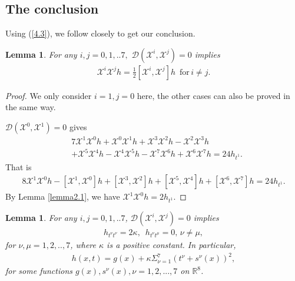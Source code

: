 \documentclass[reqno,12pt]{amsart}
\numberwithin{equation}{section}
\theoremstyle{plain}
\newtheorem{lemma}[theorem]{Lemma}
\theoremstyle{definition}
\begin{document}
\subsection{The conclusion}
Using (\ref{4.3}), we follow \cite{IMV2014} closely to get our conclusion.
\begin{lemma}\label{lemma 4.2}
For any $i,j=0,1,..7,$ $\mathcal{D}(\mathscr{X}^i,\mathscr{X}^j)=0$ implies 
   \begin{align}
       \mathscr{X}^i\mathscr{X}^j h=\frac{1}{2}[ \mathscr{X}^i,  \mathscr{X}^j]h\,\,\,\textrm{for}\,i\neq j.
   \end{align}
   
\end{lemma}
\begin{proof}
    We only consider $i=1,j=0$ here, the other cases can also be proved in the same way.
    
    $\mathcal{D}(\mathscr{X}^0,\mathscr{X}^1)=0$ gives
    \begin{align*}
        &7\mathscr{X}^1\mathscr{X}^0 h+\mathscr{X}^0 \mathscr{X}^1 h+\mathscr{X}^3 \mathscr{X}^2 h-\mathscr{X}^2 \mathscr{X}^3 h\\&+\mathscr{X}^5\mathscr{X}^4 h-\mathscr{X}^4 \mathscr{X}^5 h-\mathscr{X}^7 \mathscr{X}^6 h+\mathscr{X}^6 \mathscr{X}^7h=24h_{t^1}.        
        \end{align*}
        That is
        \begin{align*}
            8\mathscr{X}^1\mathscr{X}^0 h-[\mathscr{X}^1,\mathscr{X}^0]h+[\mathscr{X}^3,\mathscr{X}^2]h+[\mathscr{X}^5,\mathscr{X}^4]h+[\mathscr{X}^6,\mathscr{X}^7]h=24h_{t^1}.            \end{align*}
            By Lemma \ref{lemma2.1}, we have $\mathscr{X}^1 \mathscr{X}^0 h=2h_{t^1}.$
            
\end{proof}
\begin{lemma}\label{lemma 4.3}
For any $i,j=0,1,..7$,
 $\mathcal{D}(\mathscr{X}^i,\mathscr{X}^j)=0$ implies
    \begin{align}\label{4.5}
        h_{t^\nu t^\nu}=2\kappa,\,\,\, h_{t^\nu t^\mu}=0,\, \nu \neq \mu,
    \end{align}
    for $\nu,\mu=1,2,..,7$, where $\kappa$ is a positive constant. In particular,
    \begin{align}\label{4.6}
        h(x,t)=g(x)+\kappa\Sigma_{\nu=1}^7(t^\nu+s^\nu(x))^2,
    \end{align}
    for some functions $g(x), s^\nu(x),\nu=1,2,...,7$ on $\mathbb{R}^{8}$. 
\end{lemma}
\end{document}
